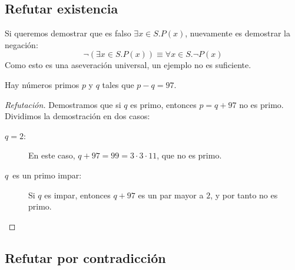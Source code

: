 \subsection{Refutar existencia}
\label{sec:refutar-existencia}

  Si queremos demostrar que es falso \(\exists x \in S. P(x)\),
  nuevamente es demostrar la negación:
  \begin{equation*}
    \neg (\exists x \in S. P(x))
      \equiv \forall x \in S. \neg P(x)
  \end{equation*}
  Como esto es una aseveración universal,
  un ejemplo no es suficiente.
  \begin{conjecture}
    Hay números primos \(p\) y \(q\)
    tales que \(p - q = 97\).
  \end{conjecture}
  \begin{proof}[Refutación]
    Demostramos que si \(q\) es primo,
    entonces \(p = q + 97\) no es primo.
    Dividimos la demostración en dos casos:
    \begin{description}
    \item[\boldmath\(q = 2\)\unboldmath:]
      En este caso,
      \(q + 97 = 99 = 3 \cdot 3 \cdot 11\),
      que no es primo.
    \item[\boldmath\(q\)\unboldmath\ es un primo impar:]
      Si \(q\) es impar,
      entonces \(q + 97\) es un par mayor a \(2\),
      y por tanto no es primo.
    \end{description}
  \end{proof}

\subsection{Refutar por contradicción}
\label{sec:refutar-contradiccion}

